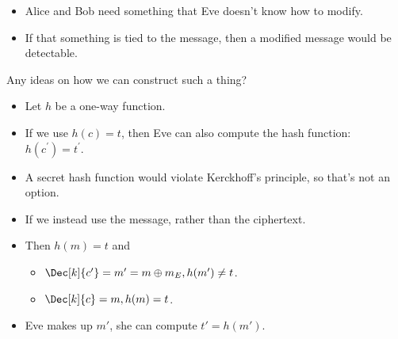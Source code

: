 \begin{frame}
  \begin{idea}
    \begin{itemize}
      \item Alice and Bob need something that Eve doesn't know how to modify.

        \pause{}

      \item If that something is tied to the message, then a modified message 
        would be detectable.
    \end{itemize}
  \end{idea}

  \pause{}

  \begin{exercise}
    Any ideas on how we can construct such a thing?
  \end{exercise}
\end{frame}

\begin{frame}
  \begin{example}
    \begin{itemize}
      \item Let \(h\) be a one-way function.
        
        \pause{}
        
      \item If we use \(h(c) = t\), then Eve can also compute the hash 
        function: \(h(c^\prime) = t^\prime\).

        \pause{}

      \item A secret hash function would violate Kerckhoff's principle, so 
        that's not an option.

        \pause{}

      \item If we instead use the message, rather than the ciphertext.
        
      \item Then \(h(m) = t\) and
        \begin{itemize}
          \item \(\Dec[k]{c^\prime} = m^\prime = m\oplus m_E, h(m^\prime)\neq 
              t\).
          \item \(\Dec[k]{c} = m, h(m) = t\).
        \end{itemize}

        \pause{}
        
      \item Eve makes up \(m'\), she can compute \(t' = h(m')\).
    \end{itemize}
  \end{example}
\end{frame}

